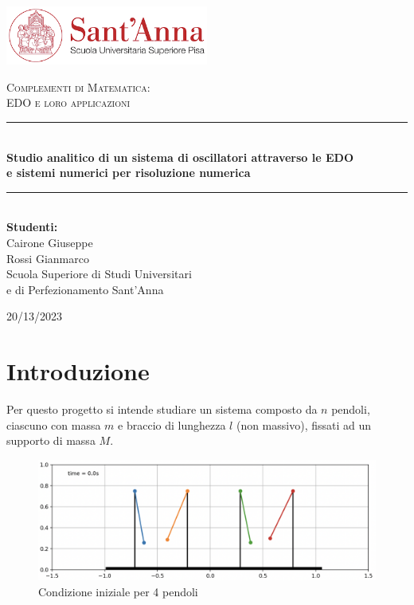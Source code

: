 \documentclass[a4paper, 12pt]{article}
\newcommand{\HRule}{\rule{\linewidth}{0.5mm}}
\begin{document}

\begin{titlepage}
  \begin{center}
    \includegraphics[width=0.5\textwidth]{main/figures/logo.png}~\\[1cm]

    \vspace{3cm}

    \textsc{\Large Complementi di Matematica: \\ EDO e loro applicazioni}\\[3cm]


    \HRule \\[0.4cm]
    {\large \bfseries Studio analitico di un sistema di oscillatori attraverso le EDO \\ e sistemi numerici per risoluzione numerica \\ [0.4cm]}
    \HRule \\[4cm]

    \large\textbf{Studenti:}\\
    Cairone Giuseppe \\ Rossi Gianmarco \\ Scuola Superiore di Studi Universitari \\ e di Perfezionamento Sant'Anna\\[3cm]

    \vfill

    {\large 20/13/2023}

  \end{center}
\end{titlepage}

\newpage

\tableofcontents

\newpage

\section{Introduzione}

Per questo progetto si intende studiare un sistema composto da $n$ pendoli, ciascuno con massa $m$ e braccio di lunghezza $l$ (non massivo), fissati ad un supporto di massa $M$.

\begin{figure}[htp!]
  \centering
  \includegraphics[width=.7\textwidth]{main/figures/fig_pendoli.png}
  \caption{Condizione iniziale per 4 pendoli}
  \label{fig:pendoli_start}
\end{figure}
\end{document}
